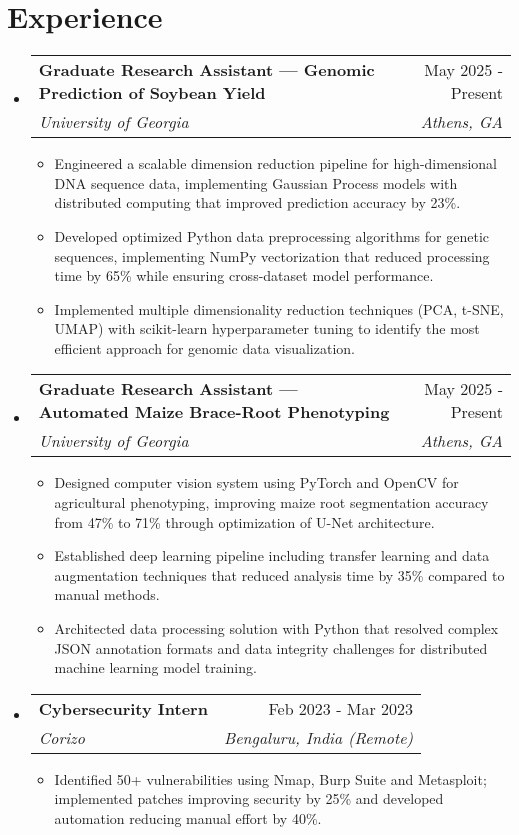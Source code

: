 \documentclass[letterpaper,10pt]{article}
\makeatletter
\newcommand{\resumeItem}[1]{
  \item\small{
    {#1 \vspace{-3pt}}
  }
}
\newcommand{\resumeSubheading}[4]{
  \vspace{-2pt}\item
    \begin{tabular*}{0.97\textwidth}{l@{\extracolsep{\fill}}r}
      \textbf{#1} & #2 \\
      \textit{\small#3} & \textit{\small #4} \\
    \end{tabular*}\vspace{-6pt}
}
\newcommand{\resumeSubHeadingListStart}{\begin{itemize}[leftmargin=*]}
\newcommand{\resumeSubHeadingListEnd}{\end{itemize}}
\newcommand{\resumeItemListStart}{\begin{itemize}}
\newcommand{\resumeItemListEnd}{\end{itemize}\vspace{-6pt}}
\makeatother
\begin{document}
\section{Experience}
  \resumeSubHeadingListStart
    \resumeSubheading
      {Graduate Research Assistant — Genomic Prediction of Soybean Yield}{May 2025 - Present}
      {University of Georgia}{Athens, GA}
      \resumeItemListStart
        \resumeItem{Engineered a scalable dimension reduction pipeline for high-dimensional DNA sequence data, implementing Gaussian Process models with distributed computing that improved prediction accuracy by 23\%.}
        \resumeItem{Developed optimized Python data preprocessing algorithms for genetic sequences, implementing NumPy vectorization that reduced processing time by 65\% while ensuring cross-dataset model performance.}
        \resumeItem{Implemented multiple dimensionality reduction techniques (PCA, t-SNE, UMAP) with scikit-learn hyperparameter tuning to identify the most efficient approach for genomic data visualization.}
      \resumeItemListEnd
      
    \resumeSubheading
      {Graduate Research Assistant — Automated Maize Brace-Root Phenotyping}{May 2025 - Present}
      {University of Georgia}{Athens, GA}
      \resumeItemListStart
        \resumeItem{Designed computer vision system using PyTorch and OpenCV for agricultural phenotyping, improving maize root segmentation accuracy from 47\% to 71\% through optimization of U-Net architecture.}
        \resumeItem{Established deep learning pipeline including transfer learning and data augmentation techniques that reduced analysis time by 35\% compared to manual methods.}
        \resumeItem{Architected data processing solution with Python that resolved complex JSON annotation formats and data integrity challenges for distributed machine learning model training.}
      \resumeItemListEnd
      
    \resumeSubheading
      {Cybersecurity Intern}{Feb 2023 - Mar 2023}
      {Corizo}{Bengaluru, India (Remote)}
      \resumeItemListStart
        \resumeItem{Identified 50+ vulnerabilities using Nmap, Burp Suite and Metasploit; implemented patches improving security by 25\% and developed automation reducing manual effort by 40\%.}
      \resumeItemListEnd
  \resumeSubHeadingListEnd

\end{document}
